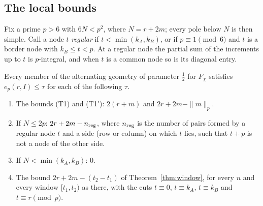 \subsection{The local bounds}
Fix a prime $p>6$ with $6N<p^2$, where $N=r+2m$; every pole below $N$ is then simple. Call a node $t$ \emph{regular} if
$t<\min(k_A,k_B)$, or if $p\equiv1\pmod6$ and $t$ is a border node with $k_B\le t<p$. At a regular node the partial sum
of the increments up to $t$ is $p$-integral, and when $t$ is a common node so is its diagonal entry.

\begin{proposition}\label{prop:chi3-local}
Every member of the alternating geometry of parameter $\frac12$ for $F_\chi$ satisfies $e_p(r,I)\le\tau$ for each of the
following $\tau$.
\begin{enumerate}[label=(\roman*),leftmargin=*]
\item The bounds (T1) and (T1$'$): $2(r+m)$ and $2r+2m-\|m\|_p$.
\item If $N\le2p$: $2r+2m-n_{\rm reg}$, where $n_{\rm reg}$ is the number of pairs formed by a regular node $t$ and a side
 (row or column) on which $t$ lies, such that $t+p$ is not a node of the other side.
\item If $N<\min(k_A,k_B)$: $0$.
\item The bound $2r+2m-(t_2-t_1)$ of Theorem~\ref{thm:window}, for every $n$ and every window $[t_1,t_2)$ as there, with the
 cuts $t\equiv0$, $t\equiv k_A$, $t\equiv k_B$ and $t\equiv r\pmod p$.
\end{enumerate}
\end{proposition}


